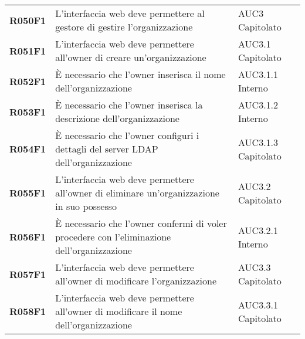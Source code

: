 \documentclass[../analisi-dei-requisiti.tex]{subfiles}
\begin{document}
\begin{longtable}[H]{>{\centering\bfseries}m{3cm} >{\centering}m{10cm} >{\centering\arraybackslash}m{3cm}}
  R050F1                               & L'interfaccia web deve permettere al gestore di gestire l'organizzazione                                                                                                                                & AUC3 Capitolato               \\
  R051F1                               & L'interfaccia web deve permettere all'owner di creare un'organizzazione                                                                                                                                 & AUC3.1 Capitolato             \\
  R052F1                               & È necessario che l'owner inserisca il nome dell'organizzazione                                                                                                                                          & AUC3.1.1 Interno              \\
  R053F1                               & È necessario che l'owner inserisca la descrizione dell'organizzazione                                                                                                                                   & AUC3.1.2 Interno              \\
  R054F1                               & È necessario che l'owner configuri i dettagli del server LDAP dell'organizzazione                                                                                                                       & AUC3.1.3 Capitolato           \\
  R055F1                               & L'interfaccia web deve permettere all'owner di eliminare un'organizzazione in suo possesso                                                                                                              & AUC3.2 Capitolato             \\
  R056F1                               & È necessario che l'owner confermi di voler procedere con l'eliminazione dell'organizzazione                                                                                                             & AUC3.2.1 Interno              \\
  R057F1                               & L'interfaccia web deve permettere all'owner di modificare l'organizzazione                                                                                                                              & AUC3.3 Capitolato             \\
  R058F1                               & L'interfaccia web deve permettere all'owner di modificare il nome dell'organizzazione                                                                                                                   & AUC3.3.1 Capitolato           \\

\end{longtable}
\end{document}
